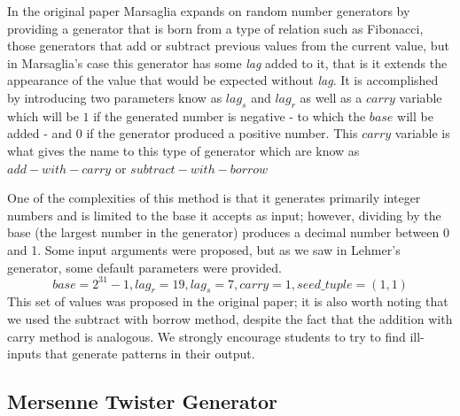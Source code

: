 In the original paper \cite{10.1214/aoap/1177005878} Marsaglia expands on random number generators by providing a generator that is born from a type of relation such as Fibonacci, those generators that add or subtract previous values from the current value, but in Marsaglia's case this generator has some \textit{lag} added to it, that is it extends the appearance of the value that would be expected without \textit{lag}. It is accomplished by introducing two parameters know as $lag_s$ and $lag_r$ as well as a $carry$ variable which will be $1$ if the generated number is negative - to which the $base$ will be added - and $0$ if the generator produced a positive number. This $carry$ variable is what gives the name to this type of generator which are know as $add-with-carry$ or $subtract-with-borrow$

One of the complexities of this method is that it generates primarily integer numbers and is limited to the base it accepts as input; however, dividing by the base (the largest number in the generator) produces a decimal number between 0 and 1. Some input arguments were proposed, but as we saw in Lehmer's generator, some default parameters were provided. 
\[base = 2^{31}-1, lag_r=19, lag_s=7, carry=1, seed\_tuple = (1,1)\]
This set of values was proposed in the original paper; it is also worth noting that we used the subtract with borrow method, despite the fact that the addition with carry method is analogous. We strongly encourage students to try to find ill-inputs that generate patterns in their output.


\subsection{Mersenne Twister Generator}
